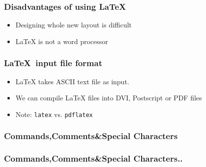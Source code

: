 \documentclass[17pt,compress]{beamer}
\newcommand{\typ}[1]{\lstinline{#1}}
\begin{document}
\begin{frame}[fragile]
  \frametitle{Disadvantages of using \LaTeX }
  \begin{itemize}
    \item Designing whole new layout is difficult
    \item LaTeX is not a word processor
  \end{itemize}
\end{frame}

\begin{frame}[fragile]
  \frametitle{\LaTeX \ input file format}
  \begin{itemize}
    \item \LaTeX \: takes ASCII text file as input.
    \item We can compile \LaTeX  \: files into DVI, Postscript or PDF files
    \item \alert{Note:} \typ{latex} vs. \typ{pdflatex} 
  \end{itemize}
\end{frame}

\begin{frame}[fragile]
  \frametitle{Commands,Comments\&Special Characters }
\end{frame}

\begin{frame}[fragile]
  \frametitle{Commands,Comments\&Special Characters..}
\end{frame}
\end{document}
